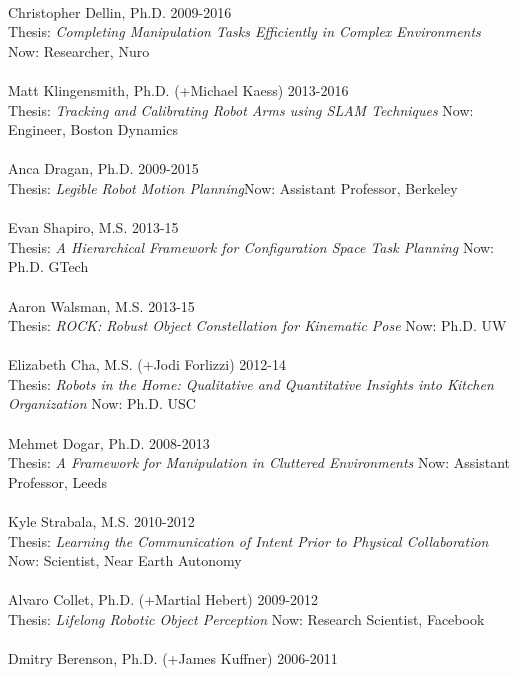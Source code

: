 \\
Christopher Dellin, Ph.D. \hfill 2009-2016\\
Thesis: \textit{Completing Manipulation Tasks Efficiently in Complex Environments} \hfill Now: Researcher, Nuro\\
\\
Matt Klingensmith, Ph.D. (+Michael Kaess) \hfill 2013-2016\\
Thesis: \textit{Tracking and Calibrating Robot Arms using SLAM Techniques} \hfill Now: Engineer, Boston Dynamics\\
\\
Anca Dragan, Ph.D. \hfill 2009-2015\\
Thesis: \textit{Legible Robot Motion Planning}\hfill Now: Assistant Professor, Berkeley\\
\\
Evan Shapiro, M.S.  \hfill 2013-15\\
Thesis: \textit{A Hierarchical Framework for Configuration Space Task Planning} \hfill Now: Ph.D. GTech\\
\\
Aaron Walsman, M.S.  \hfill 2013-15\\
Thesis: \textit{ROCK: Robust Object Constellation for Kinematic Pose} \hfill Now: Ph.D. UW\\
\\
Elizabeth Cha, M.S. (+Jodi Forlizzi)  \hfill 2012-14\\
Thesis: \textit{Robots in the Home: Qualitative and Quantitative Insights into Kitchen Organization} \hfill Now: Ph.D. USC\\
\\
Mehmet Dogar, Ph.D. \hfill 2008-2013\\
Thesis: \textit{A Framework for Manipulation in Cluttered Environments} \hfill Now: Assistant Professor, Leeds\\
\\
Kyle Strabala, M.S. \hfill 2010-2012\\
Thesis: \textit{Learning the Communication of Intent Prior to Physical Collaboration} \hfill Now: Scientist, Near Earth Autonomy\\
\\
Alvaro Collet, Ph.D. (+Martial Hebert) \hfill 2009-2012\\
Thesis: \textit{Lifelong Robotic Object Perception} \hfill Now: Research Scientist, Facebook\\
\\
Dmitry Berenson, Ph.D. (+James Kuffner) \hfill 2006-2011\\
